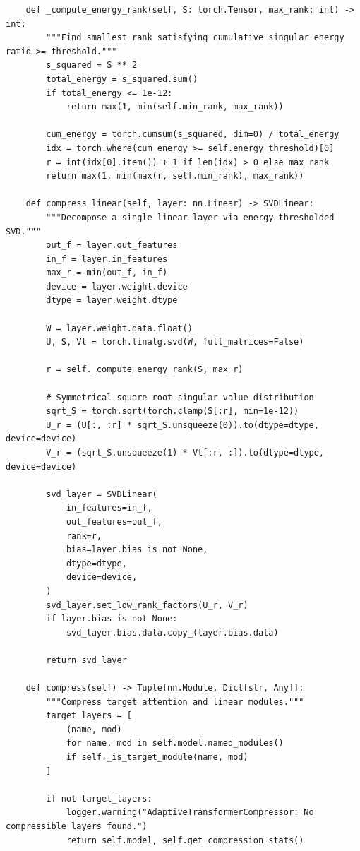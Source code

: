 \begin{lstlisting}
    def _compute_energy_rank(self, S: torch.Tensor, max_rank: int) -> int:
        """Find smallest rank satisfying cumulative singular energy ratio >= threshold."""
        s_squared = S ** 2
        total_energy = s_squared.sum()
        if total_energy <= 1e-12:
            return max(1, min(self.min_rank, max_rank))

        cum_energy = torch.cumsum(s_squared, dim=0) / total_energy
        idx = torch.where(cum_energy >= self.energy_threshold)[0]
        r = int(idx[0].item()) + 1 if len(idx) > 0 else max_rank
        return max(1, min(max(r, self.min_rank), max_rank))

    def compress_linear(self, layer: nn.Linear) -> SVDLinear:
        """Decompose a single linear layer via energy-thresholded SVD."""
        out_f = layer.out_features
        in_f = layer.in_features
        max_r = min(out_f, in_f)
        device = layer.weight.device
        dtype = layer.weight.dtype

        W = layer.weight.data.float()
        U, S, Vt = torch.linalg.svd(W, full_matrices=False)

        r = self._compute_energy_rank(S, max_r)

        # Symmetrical square-root singular value distribution
        sqrt_S = torch.sqrt(torch.clamp(S[:r], min=1e-12))
        U_r = (U[:, :r] * sqrt_S.unsqueeze(0)).to(dtype=dtype, device=device)
        V_r = (sqrt_S.unsqueeze(1) * Vt[:r, :]).to(dtype=dtype, device=device)

        svd_layer = SVDLinear(
            in_features=in_f,
            out_features=out_f,
            rank=r,
            bias=layer.bias is not None,
            dtype=dtype,
            device=device,
        )
        svd_layer.set_low_rank_factors(U_r, V_r)
        if layer.bias is not None:
            svd_layer.bias.data.copy_(layer.bias.data)

        return svd_layer

    def compress(self) -> Tuple[nn.Module, Dict[str, Any]]:
        """Compress target attention and linear modules."""
        target_layers = [
            (name, mod)
            for name, mod in self.model.named_modules()
            if self._is_target_module(name, mod)
        ]

        if not target_layers:
            logger.warning("AdaptiveTransformerCompressor: No compressible layers found.")
            return self.model, self.get_compression_stats()


\end{lstlisting}
